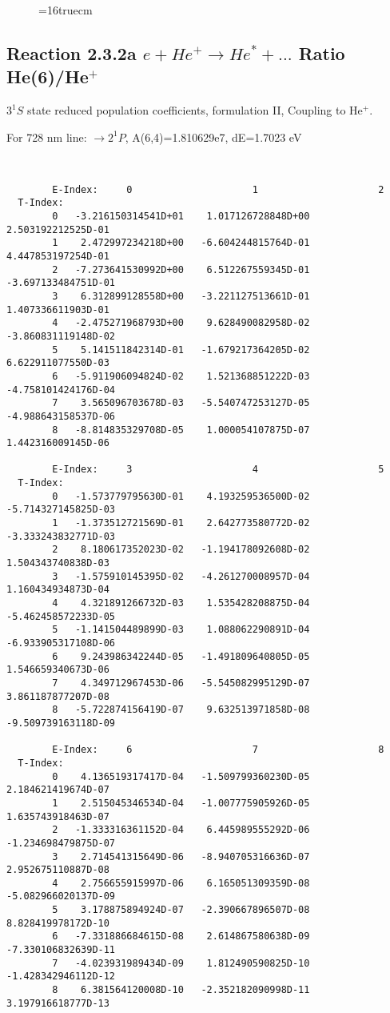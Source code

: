 \documentclass[12pt]{article}
\begin{document}
\begin{figure} \label{2.2e}
\epsfxsize=16truecm
\end{figure}
\newpage


\subsection{
  Reaction 2.3.2a $e + He^+ \rightarrow He^* + ... $ Ratio He(6)/He$^+$
}

  $3^1S$ state
  reduced population coefficients, formulation II,
  Coupling to He$^+$.

  For 728 nm line:  $\rightarrow 2^1P$, A(6,4)=1.810629e7, dE=1.7023 eV

\begin{small}\begin{verbatim}


        E-Index:     0                     1                     2
  T-Index:
        0   -3.216150314541D+01    1.017126728848D+00    2.503192212525D-01
        1    2.472997234218D+00   -6.604244815764D-01    4.447853197254D-01
        2   -7.273641530992D+00    6.512267559345D-01   -3.697133484751D-01
        3    6.312899128558D+00   -3.221127513661D-01    1.407336611903D-01
        4   -2.475271968793D+00    9.628490082958D-02   -3.860831119148D-02
        5    5.141511842314D-01   -1.679217364205D-02    6.622911077550D-03
        6   -5.911906094824D-02    1.521368851222D-03   -4.758101424176D-04
        7    3.565096703678D-03   -5.540747253127D-05   -4.988643158537D-06
        8   -8.814835329708D-05    1.000054107875D-07    1.442316009145D-06

        E-Index:     3                     4                     5
  T-Index:
        0   -1.573779795630D-01    4.193259536500D-02   -5.714327145825D-03
        1   -1.373512721569D-01    2.642773580772D-02   -3.333243832771D-03
        2    8.180617352023D-02   -1.194178092608D-02    1.504343740838D-03
        3   -1.575910145395D-02   -4.261270008957D-04    1.160434934873D-04
        4    4.321891266732D-03    1.535428208875D-04   -5.462458572233D-05
        5   -1.141504489899D-03    1.088062290891D-04   -6.933905317108D-06
        6    9.243986342244D-05   -1.491809640805D-05    1.546659340673D-06
        7    4.349712967453D-06   -5.545082995129D-07    3.861187877207D-08
        8   -5.722874156419D-07    9.632513971858D-08   -9.509739163118D-09

        E-Index:     6                     7                     8
  T-Index:
        0    4.136519317417D-04   -1.509799360230D-05    2.184621419674D-07
        1    2.515045346534D-04   -1.007775905926D-05    1.635743918463D-07
        2   -1.333316361152D-04    6.445989555292D-06   -1.234698479875D-07
        3    2.714541315649D-06   -8.940705316636D-07    2.952675110887D-08
        4    2.756655915997D-06    6.165051309359D-08   -5.082966020137D-09
        5    3.178875894924D-07   -2.390667896507D-08    8.828419978172D-10
        6   -7.331886684615D-08    2.614867580638D-09   -7.330106832639D-11
        7   -4.023931989434D-09    1.812490590825D-10   -1.428342946112D-12
        8    6.381564120008D-10   -2.352182090998D-11    3.197916618777D-13


\end{verbatim}
\end{small}
\end{document}
